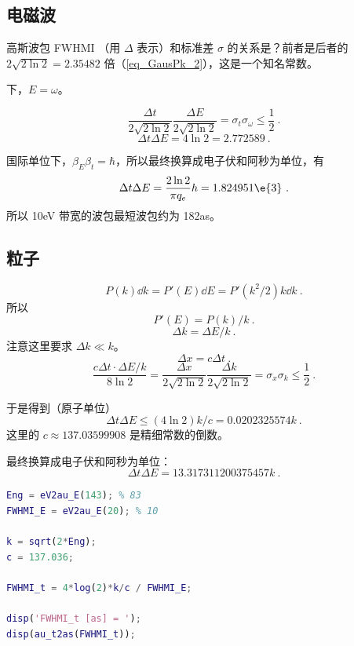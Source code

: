 
\subsection{电磁波}
高斯波包 FWHMI （用 $\Delta$ 表示）和标准差 $\sigma$ 的关系是？前者是后者的 $2\sqrt{2\ln 2} = 2.35482$ 倍（\autoref{eq_GausPk_2}），这是一个知名常数。

下，$E = \omega$。

\begin{equation}
\frac{\Delta t}{2\sqrt{2\ln 2}}\frac{\Delta E}{2\sqrt{2\ln 2}} = \sigma_t \sigma_\omega \leq \frac{1}{2}~.
\end{equation}
\begin{equation}
\Delta t\Delta E = 4\ln 2 = 2.772589~.
\end{equation}

国际单位下，$\beta_E\beta_t = \hbar$，所以最终换算成电子伏和阿秒为单位，有
\begin{equation}
\Delta t \Delta E  = \frac{2\ln 2}{\pi q_e}h = 1.824951\e{3}~.
\end{equation}
所以 10eV 带宽的波包最短波包约为 182as。

\subsection{粒子}
\begin{equation}
P(k)\dd{k} = P'(E)\dd{E} = P'(k^2/2)k\dd{k}~.
\end{equation}
所以
\begin{equation}
P'(E) = P(k)/k~.
\end{equation}
\begin{equation}
\Delta k = \Delta E/k~.
\end{equation}
注意这里要求 $\Delta k \ll k$。
\begin{equation}
\Delta x = c\Delta t~.
\end{equation}
\begin{equation}
\frac{c\Delta t \cdot \Delta E/k}{8\ln 2} = \frac{\Delta x}{2\sqrt{2\ln 2}}\frac{\Delta k}{2\sqrt{2\ln 2}} = \sigma_x \sigma_k \leq \frac{1}{2}~.
\end{equation}

于是得到（原子单位）
\begin{equation}
\Delta t\Delta E \leq (4\ln 2)k/c = 0.0202325574 k~.
\end{equation}
这里的 $c \approx 137.03599908$ 是精细常数的倒数。

最终换算成电子伏和阿秒为单位：
\begin{equation}
\Delta t \Delta E = 13.317311200375457 k~. %
\end{equation}

\begin{lstlisting}[language=matlab]
% 以上计算的 Matlab 代码
Eng = eV2au_E(143); % 83
FWHMI_E = eV2au_E(20); % 10

k = sqrt(2*Eng);
c = 137.036;

FWHMI_t = 4*log(2)*k/c / FWHMI_E;

disp('FWHMI_t [as] = ');
disp(au_t2as(FWHMI_t));
\end{lstlisting}
